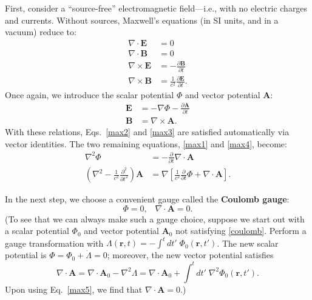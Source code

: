 \documentclass[prx,12pt]{revtex4-2}
\begin{document}
First, consider a ``source-free'' electromagnetic field---i.e., with
no electric charges and currents.  Without sources, Maxwell's
equations (in SI units, and in a vacuum) reduce to:
\begin{align}
  \nabla\cdot \mathbf{E} &= 0 \label{max1} \\
  \nabla\cdot \mathbf{B} &= 0 \label{max2}\\
  \nabla\times \mathbf{E} &= -\frac{\partial \mathbf{B}}{\partial t} \label{max3}\\
  \nabla\times \mathbf{B} &= \frac{1}{c^2} \frac{\partial \mathbf{E}}{\partial t}.
  \label{max4}
\end{align}
Once again, we introduce the scalar potential $\Phi$ and vector
potential $\mathbf{A}$:
\begin{align}
  \mathbf{E} &= - \nabla \Phi - \frac{\partial\mathbf{A}}{\partial t}
  \label{Efield} \\
  \mathbf{B} &= \nabla \times \mathbf{A}.
  \label{Bfield}
\end{align}
With these relations, Eqs.~\eqref{max2} and \eqref{max3} are satisfied
automatically via vector identities.  The two remaining equations,
\eqref{max1} and \eqref{max4}, become:
\begin{align}
  \nabla^2 \Phi &= -\frac{\partial}{\partial t} \nabla \cdot \mathbf{A} \label{max5} \\
  \left(\nabla^2 - \frac{1}{c^2}\frac{\partial^2}{\partial t^2}\right)
  \mathbf{A} &= \nabla\left[\frac{1}{c^2}\frac{\partial}{\partial t}  \Phi + \nabla\cdot\mathbf{A}\right]. \label{max6}
\end{align}

In the next step, we choose a convenient gauge called the
\textbf{Coulomb gauge}:
\begin{equation}
  \Phi = 0, \;\;\; \nabla \cdot \mathbf{A} = 0.
  \label{coulomb}
\end{equation}
(To see that we can always make such a gauge choice, suppose we start
out with a scalar potential $\Phi_0$ and vector potential
$\mathbf{A}_0$ not satisfying \eqref{coulomb}.  Perform a gauge
transformation with $\Lambda(\mathbf{r}, t) = - \int^t dt'\;
\Phi_0(\mathbf{r}, t')$.  The new scalar potential is $\Phi = \Phi_0 +
\dot{\Lambda} = 0$; moreover, the new vector potential satisfies
\begin{equation}
  \nabla\cdot\mathbf{A} = \nabla\cdot \mathbf{A}_0 - \nabla^2 \Lambda
  = \nabla\cdot \mathbf{A}_0 + \int^t dt'\; \nabla^2\Phi_0(\mathbf{r}, t').
\end{equation}
Upon using Eq.~\eqref{max5}, we find that $\nabla\cdot\mathbf{A} =
0$.)
\end{document}
